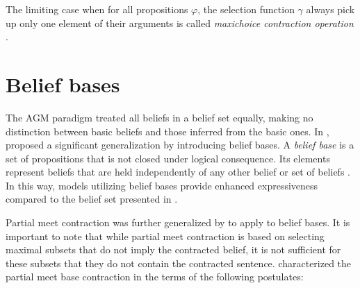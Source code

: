 \begin{definition}
    The limiting case when for all propositions $\varphi$, the selection function $\gamma$ always pick up only one element of their arguments is called \textit{maxichoice contraction operation} \citep{AGM1985}.
\end{definition}

\section{Belief bases}

The AGM paradigm treated all beliefs in a belief set equally, making no distinction between basic beliefs and those inferred from the basic ones. In \citet{Hansson1993b}, \citeauthor{Hansson1993b} proposed a significant generalization by introducing belief bases. A \textit{belief base} is a set of propositions that is not closed under logical consequence. Its elements represent beliefs that are held independently of any other belief or set of beliefs \citep{Hansson2022}. In this way, models utilizing belief bases provide enhanced expressiveness compared to the belief set presented in \citet{AGM1985}.

Partial meet contraction was further generalized by \citeauthor{Hansson1993b} to apply to belief bases. It is important to note that while partial meet contraction is based on selecting maximal subsets that do not imply the contracted belief, it is not sufficient for these subsets that they do not contain the contracted sentence. \citeauthor{Hansson1993b} characterized the partial meet base contraction in the terms of the following postulates:

